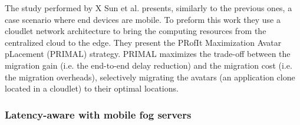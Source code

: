 \noindent\tab The study performed by X Sun et al. \cite{sun2016primal} presents, similarly to the previous ones, a case scenario where end devices are mobile. To preform this work they use a cloudlet network architecture to bring the computing resources from the centralized cloud to the edge. They present the PRofIt Maximization Avatar pLacement (PRIMAL) strategy. PRIMAL maximizes the trade-off between the migration gain (i.e. the end-to-end delay reduction) and the migration cost (i.e. the migration overheads), selectively migrating the avatars (an application clone located in a cloudlet) to their optimal locations. %

\subsubsection{Latency-aware with mobile fog servers}
